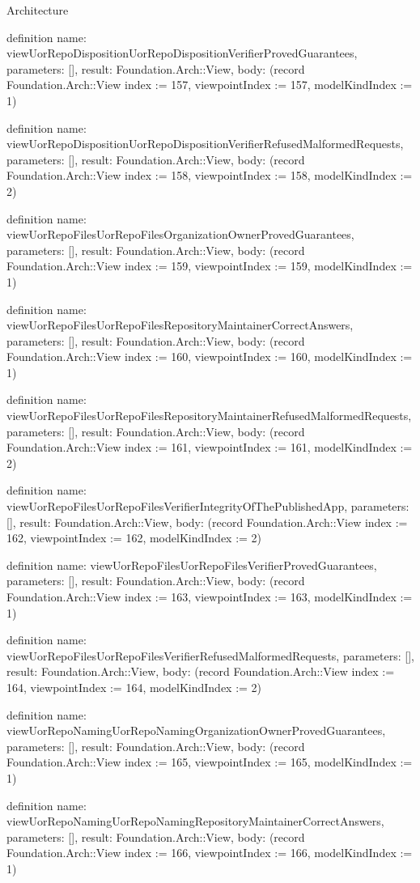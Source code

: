 \begin{lexlean}{Architecture}
\begin{semanticmodule}
definition{
  name: viewUorRepoDispositionUorRepoDispositionVerifierProvedGuarantees,
  parameters: [],
  result: Foundation.Arch::View,
  body: (record Foundation.Arch::View {index := 157, viewpointIndex := 157, modelKindIndex := 1})
}

definition{
  name: viewUorRepoDispositionUorRepoDispositionVerifierRefusedMalformedRequests,
  parameters: [],
  result: Foundation.Arch::View,
  body: (record Foundation.Arch::View {index := 158, viewpointIndex := 158, modelKindIndex := 2})
}

definition{
  name: viewUorRepoFilesUorRepoFilesOrganizationOwnerProvedGuarantees,
  parameters: [],
  result: Foundation.Arch::View,
  body: (record Foundation.Arch::View {index := 159, viewpointIndex := 159, modelKindIndex := 1})
}

definition{
  name: viewUorRepoFilesUorRepoFilesRepositoryMaintainerCorrectAnswers,
  parameters: [],
  result: Foundation.Arch::View,
  body: (record Foundation.Arch::View {index := 160, viewpointIndex := 160, modelKindIndex := 1})
}

definition{
  name: viewUorRepoFilesUorRepoFilesRepositoryMaintainerRefusedMalformedRequests,
  parameters: [],
  result: Foundation.Arch::View,
  body: (record Foundation.Arch::View {index := 161, viewpointIndex := 161, modelKindIndex := 2})
}

definition{
  name: viewUorRepoFilesUorRepoFilesVerifierIntegrityOfThePublishedApp,
  parameters: [],
  result: Foundation.Arch::View,
  body: (record Foundation.Arch::View {index := 162, viewpointIndex := 162, modelKindIndex := 2})
}

definition{
  name: viewUorRepoFilesUorRepoFilesVerifierProvedGuarantees,
  parameters: [],
  result: Foundation.Arch::View,
  body: (record Foundation.Arch::View {index := 163, viewpointIndex := 163, modelKindIndex := 1})
}

definition{
  name: viewUorRepoFilesUorRepoFilesVerifierRefusedMalformedRequests,
  parameters: [],
  result: Foundation.Arch::View,
  body: (record Foundation.Arch::View {index := 164, viewpointIndex := 164, modelKindIndex := 2})
}

definition{
  name: viewUorRepoNamingUorRepoNamingOrganizationOwnerProvedGuarantees,
  parameters: [],
  result: Foundation.Arch::View,
  body: (record Foundation.Arch::View {index := 165, viewpointIndex := 165, modelKindIndex := 1})
}

definition{
  name: viewUorRepoNamingUorRepoNamingRepositoryMaintainerCorrectAnswers,
  parameters: [],
  result: Foundation.Arch::View,
  body: (record Foundation.Arch::View {index := 166, viewpointIndex := 166, modelKindIndex := 1})
}


\end{semanticmodule}
\end{lexlean}
